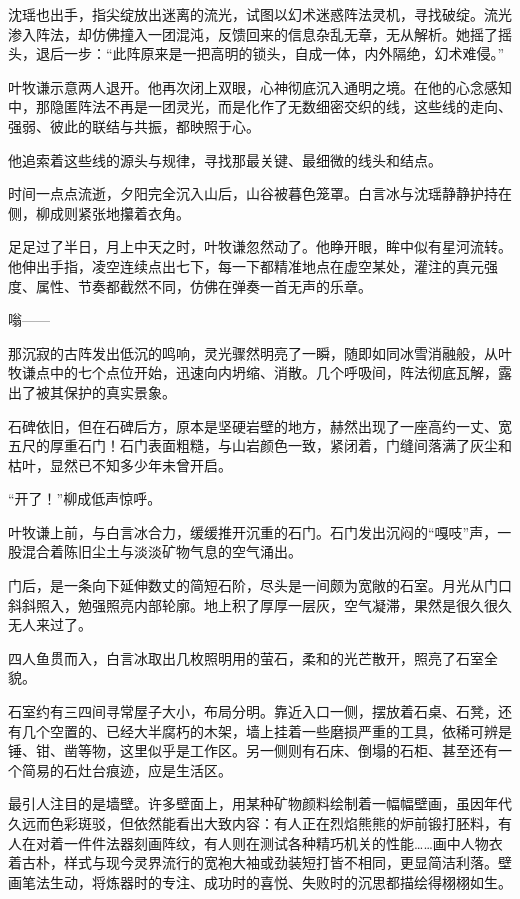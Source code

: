 沈瑶也出手，指尖绽放出迷离的流光，试图以幻术迷惑阵法灵机，寻找破绽。流光渗入阵法，却仿佛撞入一团混沌，反馈回来的信息杂乱无章，无从解析。她摇了摇头，退后一步：“此阵原来是一把高明的锁头，自成一体，内外隔绝，幻术难侵。”

叶牧谦示意两人退开。他再次闭上双眼，心神彻底沉入通明之境。在他的心念感知中，那隐匿阵法不再是一团灵光，而是化作了无数细密交织的线，这些线的走向、强弱、彼此的联结与共振，都映照于心。

他追索着这些线的源头与规律，寻找那最关键、最细微的线头和结点。

\vspace{2em}

时间一点点流逝，夕阳完全沉入山后，山谷被暮色笼罩。白言冰与沈瑶静静护持在侧，柳成则紧张地攥着衣角。

足足过了半日，月上中天之时，叶牧谦忽然动了。他睁开眼，眸中似有星河流转。他伸出手指，凌空连续点出七下，每一下都精准地点在虚空某处，灌注的真元强度、属性、节奏都截然不同，仿佛在弹奏一首无声的乐章。

嗡——

那沉寂的古阵发出低沉的鸣响，灵光骤然明亮了一瞬，随即如同冰雪消融般，从叶牧谦点中的七个点位开始，迅速向内坍缩、消散。几个呼吸间，阵法彻底瓦解，露出了被其保护的真实景象。

石碑依旧，但在石碑后方，原本是坚硬岩壁的地方，赫然出现了一座高约一丈、宽五尺的厚重石门！石门表面粗糙，与山岩颜色一致，紧闭着，门缝间落满了灰尘和枯叶，显然已不知多少年未曾开启。

“开了！”柳成低声惊呼。

叶牧谦上前，与白言冰合力，缓缓推开沉重的石门。石门发出沉闷的“嘎吱”声，一股混合着陈旧尘土与淡淡矿物气息的空气涌出。

门后，是一条向下延伸数丈的简短石阶，尽头是一间颇为宽敞的石室。月光从门口斜斜照入，勉强照亮内部轮廓。地上积了厚厚一层灰，空气凝滞，果然是很久很久无人来过了。

四人鱼贯而入，白言冰取出几枚照明用的萤石，柔和的光芒散开，照亮了石室全貌。

石室约有三四间寻常屋子大小，布局分明。靠近入口一侧，摆放着石桌、石凳，还有几个空置的、已经大半腐朽的木架，墙上挂着一些磨损严重的工具，依稀可辨是锤、钳、凿等物，这里似乎是工作区。另一侧则有石床、倒塌的石柜、甚至还有一个简易的石灶台痕迹，应是生活区。

最引人注目的是墙壁。许多壁面上，用某种矿物颜料绘制着一幅幅壁画，虽因年代久远而色彩斑驳，但依然能看出大致内容：有人正在烈焰熊熊的炉前锻打胚料，有人在对着一件件法器刻画阵纹，有人则在测试各种精巧机关的性能……画中人物衣着古朴，样式与现今灵界流行的宽袍大袖或劲装短打皆不相同，更显简洁利落。壁画笔法生动，将炼器时的专注、成功时的喜悦、失败时的沉思都描绘得栩栩如生。


